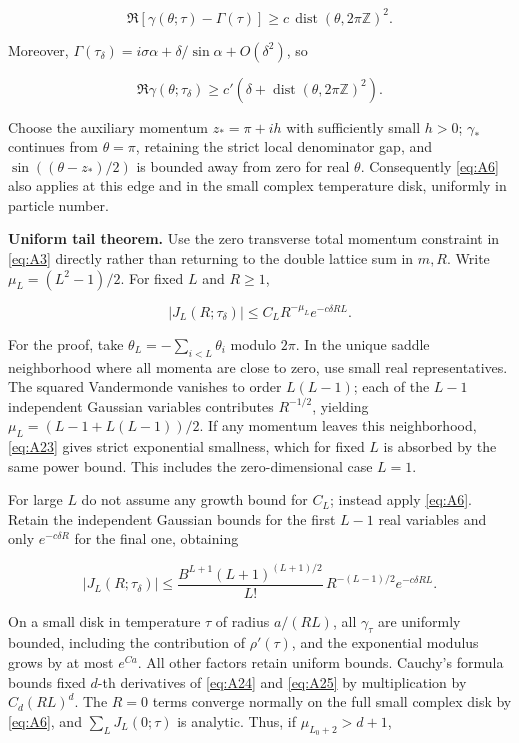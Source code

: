 \documentclass[11pt,a4paper]{article}
\numberwithin{equation}{section}
\theoremstyle{plain}
\theoremstyle{definition}
\begin{document}
\[\Re[\gamma(\theta;\tau)-\Gamma(\tau)]\ge c\,\operatorname{dist}(\theta,2\pi\mathbb Z)^2.\]

Moreover, \(\Gamma(\tau_\delta)=i\sigma\alpha+\delta/\sin\alpha+O(\delta^2)\), so

\begin{equation}
\boxed{\Re\gamma(\theta;\tau_\delta)\ge c'(\delta+\operatorname{dist}(\theta,2\pi\mathbb Z)^2).}
\label{eq:A23}
\end{equation}

Choose the auxiliary momentum \(z_*=\pi+ih\) with sufficiently small \(h>0\); \(\gamma_*\) continues from \(\theta=\pi\), retaining the strict local denominator gap, and \(\sin((\theta-z_*)/2)\) is bounded away from zero for real \(\theta\). Consequently \eqref{eq:A6} also applies at this edge and in the small complex temperature disk, uniformly in particle number.

\textbf{Uniform tail theorem.} Use the zero transverse total momentum constraint in \eqref{eq:A3} directly rather than returning to the double lattice sum in \(m,R\). Write \(\mu_L=(L^2-1)/2\). For fixed \(L\) and \(R\ge1\),

\begin{equation}
|J_L(R;\tau_\delta)|\le C_L R^{-\mu_L}e^{-c\delta RL}.
\label{eq:A24}
\end{equation}

For the proof, take \(\theta_L=-\sum_{i<L}\theta_i\) modulo \(2\pi\). In the unique saddle neighborhood where all momenta are close to zero, use small real representatives. The squared Vandermonde vanishes to order \(L(L-1)\); each of the \(L-1\) independent Gaussian variables contributes \(R^{-1/2}\), yielding \(\mu_L=(L-1+L(L-1))/2\). If any momentum leaves this neighborhood, \eqref{eq:A23} gives strict exponential smallness, which for fixed \(L\) is absorbed by the same power bound. This includes the zero-dimensional case \(L=1\).

For large \(L\) do not assume any growth bound for \(C_L\); instead apply \eqref{eq:A6}. Retain the independent Gaussian bounds for the first \(L-1\) real variables and only \(e^{-c\delta R}\) for the final one, obtaining

\begin{equation}
|J_L(R;\tau_\delta)|\le \frac{B^{L+1}(L+1)^{(L+1)/2}}{L!}\,R^{-(L-1)/2}e^{-c\delta RL}.
\label{eq:A25}
\end{equation}

On a small disk in temperature \(\tau\) of radius \(a/(RL)\), all \(\gamma_\tau\) are uniformly bounded, including the contribution of \(\rho'(\tau)\), and the exponential modulus grows by at most \(e^{Ca}\). All other factors retain uniform bounds. Cauchy's formula bounds fixed \(d\)-th derivatives of \eqref{eq:A24} and \eqref{eq:A25} by multiplication by \(C_d(RL)^d\). The \(R=0\) terms converge normally on the full small complex disk by \eqref{eq:A6}, and \(\sum_L J_L(0;\tau)\) is analytic. Thus, if \(\mu_{L_0+2}>d+1\),
\end{document}
